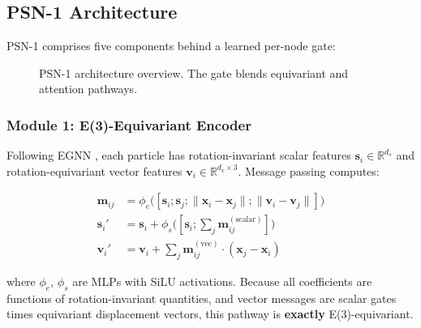 \documentclass[11pt,a4paper]{article}
\begin{document}
\subsection{PSN-1 Architecture}

PSN-1 comprises five components behind a learned per-node gate:

\begin{figure}[H]
\centering
{}
\caption{PSN-1 architecture overview. The gate blends equivariant and attention pathways.}
\label{fig:arch}
\end{figure}

\subsubsection{Module 1: E(3)-Equivariant Encoder}

Following EGNN \cite{satorras2021egnn}, each particle has rotation-invariant scalar features $\mathbf{s}_i \in \mathbb{R}^{d_s}$ and rotation-equivariant vector features $\mathbf{v}_i \in \mathbb{R}^{d_v \times 3}$. Message passing computes:

\begin{align}
    \mathbf{m}_{ij} &= \phi_e\big([\mathbf{s}_i; \mathbf{s}_j; \|\mathbf{x}_i - \mathbf{x}_j\|; \|\mathbf{v}_i - \mathbf{v}_j\|]\big) \\
    \mathbf{s}_i' &= \mathbf{s}_i + \phi_s\big([\mathbf{s}_i; \sum_j \mathbf{m}_{ij}^{(\text{scalar})}]\big) \\
    \mathbf{v}_i' &= \mathbf{v}_i + \sum_j \mathbf{m}_{ij}^{(\text{vec})} \cdot (\mathbf{x}_j - \mathbf{x}_i)
\end{align}

where $\phi_e$, $\phi_s$ are MLPs with SiLU activations. Because all coefficients are functions of rotation-invariant quantities, and vector messages are scalar gates times equivariant displacement vectors, this pathway is \textbf{exactly} E(3)-equivariant.
\end{document}

